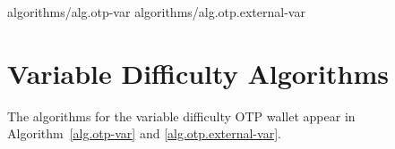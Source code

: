 {algorithms/alg.otp-var}
{algorithms/alg.otp.external-var}

\section{Variable Difficulty Algorithms}

The algorithms for the variable difficulty OTP wallet
appear in Algorithm~\ref{alg.otp-var} and \ref{alg.otp.external-var}.
